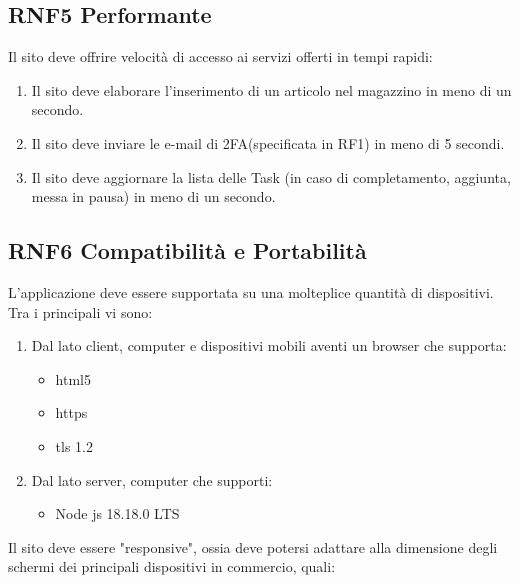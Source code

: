 \documentclass{report}
\begin{document}
\subsection*{RNF5 Performante}
Il sito deve offrire velocità di accesso ai servizi offerti in tempi rapidi:
\begin{enumerate}
	\item Il sito deve elaborare l'inserimento di un articolo nel magazzino in meno di un secondo.
	\item Il sito deve inviare le e-mail di 2FA(specificata in RF1) in meno di 5 secondi.
	\item Il sito deve aggiornare la lista delle Task (in caso di completamento, aggiunta, messa in pausa) in meno di un secondo.
\end{enumerate}

\subsection*{RNF6 Compatibilità e Portabilità}
L'applicazione deve essere supportata su una molteplice quantità di dispositivi.
Tra i principali vi sono:
\begin{enumerate}
	\item Dal lato client, computer e dispositivi mobili aventi un browser che supporta:
    \begin{itemize}
		\item html5
		\item https
		\item tls 1.2
	\end{itemize}
	\item Dal lato server, computer che supporti:
	\begin{itemize}
		\item Node js 18.18.0 LTS
	\end{itemize}
\end{enumerate}
Il sito deve essere "responsive", ossia deve potersi adattare alla dimensione degli schermi dei principali dispositivi in commercio, quali:
\end{document}
